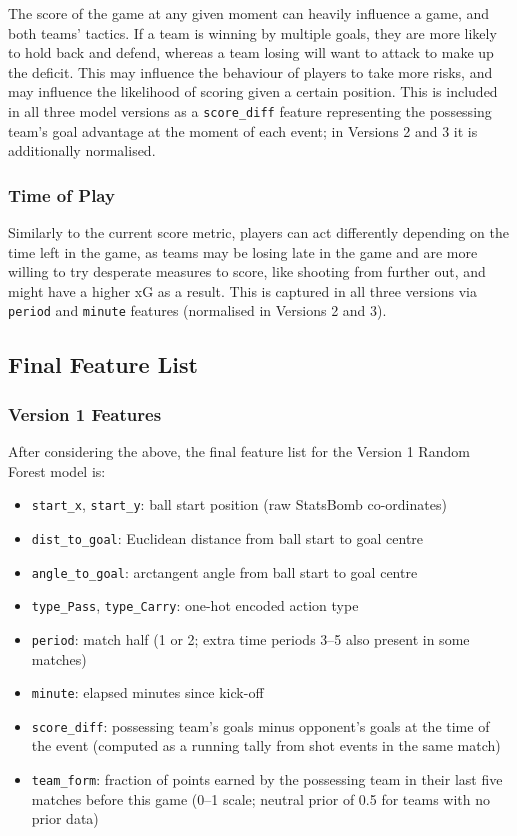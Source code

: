 \documentclass{article}
\begin{document}
The score of the game at any given moment can heavily influence a game, and both teams' tactics. If a team is winning by multiple goals, they are more likely to hold back and defend, whereas a team losing will want to attack to make up the deficit. This may influence the behaviour of players to take more risks, and may influence the likelihood of scoring given a certain position. This is included in all three model versions as a \texttt{score\_diff} feature representing the possessing team's goal advantage at the moment of each event; in Versions 2 and 3 it is additionally normalised.

\subsubsection{Time of Play}

Similarly to the current score metric, players can act differently depending on the time left in the game, as teams may be losing late in the game and are more willing to try desperate measures to score, like shooting from further out, and might have a higher xG as a result. This is captured in all three versions via \texttt{period} and \texttt{minute} features (normalised in Versions 2 and 3).

\subsection{Final Feature List}

\subsubsection{Version 1 Features}

After considering the above, the final feature list for the Version 1 Random Forest model is:

\begin{itemize}
    \item \texttt{start\_x}, \texttt{start\_y}: ball start position (raw StatsBomb co-ordinates)
    \item \texttt{dist\_to\_goal}: Euclidean distance from ball start to goal centre
    \item \texttt{angle\_to\_goal}: arctangent angle from ball start to goal centre
    \item \texttt{type\_Pass}, \texttt{type\_Carry}: one-hot encoded action type
    \item \texttt{period}: match half (1 or 2; extra time periods 3--5 also present in some matches)
    \item \texttt{minute}: elapsed minutes since kick-off
    \item \texttt{score\_diff}: possessing team's goals minus opponent's goals at the time of the event (computed as a running tally from shot events in the same match)
    \item \texttt{team\_form}: fraction of points earned by the possessing team in their last five matches before this game (0--1 scale; neutral prior of 0.5 for teams with no prior data)
\end{itemize}
\end{document}
